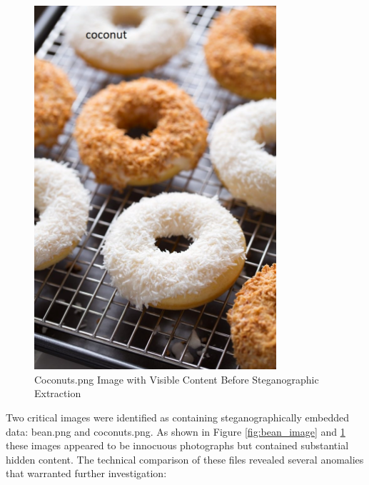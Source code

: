 \begin{figure}[htbp]
    \centering
    \includegraphics[width=0.8\textwidth]{images/Artifact and Evidence Recovery/coconuts_recipe.png}
    \caption{Coconuts.png Image with Visible Content Before Steganographic Extraction}
    \label{fig:coconuts_image}
\end{figure}

Two critical images were identified as containing steganographically embedded data: bean.png and coconuts.png. As shown in Figure \ref{fig:bean_image} and \ref{fig:coconuts_image} these images appeared to be innocuous photographs but contained substantial hidden content. The technical comparison of these files revealed several anomalies that warranted further investigation:

